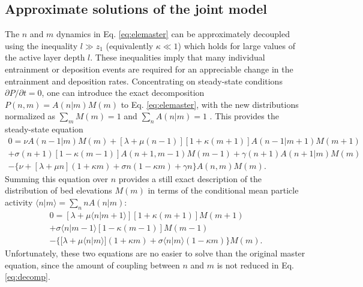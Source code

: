 \subsection{Approximate solutions of the joint model}
\label{sec:eleanalytical}

The $n$ and $m$ dynamics in Eq. \ref{eq:elemaster} can be approximately decoupled using the inequality $l \gg z_1$ (equivalently $\kappa \ll 1$) which holds for large values of the active layer depth $l$.
These inequalities imply that many individual entrainment or deposition events are required for an appreciable change in the entrainment and deposition rates.
Concentrating on steady-state conditions $\partial P/\partial t = 0$, one can introduce the exact decomposition $P(n,m) = A(n|m)M(m)$ to Eq. \ref{eq:elemaster}, with the new distributions normalized as $\sum_m M(m)=1$ and $\sum_n A(n|m)=1$ \citep[e.g.][]{Haken1978}.
This provides the steady-state equation
\begin{multline}
	0 =  
	\nu A(n-1|m)M(m) + [\lambda + \mu(n-1)][1+\kappa(m+1)]A(n-1|m+1)M(m+1)\\  
	+ \sigma(n+1)[1-\kappa(m-1)]A(n+1,m-1)M(m-1) + \gamma(n+1)A(n+1|m)M(m) \\
	- 
	\{ \nu + [\lambda+ \mu n ](1+\kappa m) +  \sigma n ( 1- \kappa m) + \gamma n \}A(n,m)M(m).
	\label{eq:decomp}
\end{multline}
Summing this equation over $n$ provides a still exact description of the distribution of bed elevations $M(m)$ in terms of the conditional mean particle activity $\langle n | m \rangle = \sum_{n}nA(n|m)$:
\begin{multline}
	0 =  [\lambda + \mu\langle n | m+1\rangle][1+\kappa(m+1)]M(m+1)
	\\+ \sigma\langle n | m-1\rangle[1-\kappa(m-1)]M(m-1) \\
	- 
	\{  [\lambda+ \mu \langle n | m\rangle ](1+\kappa m) +  \sigma  \langle n | m\rangle( 1- \kappa m) \}M(m).
	\label{eq:approxele}
\end{multline}
Unfortunately, these two equations are no easier to solve than the original master equation, since the amount of coupling between $n$ and $m$ is not reduced in Eq. \ref{eq:decomp}.

